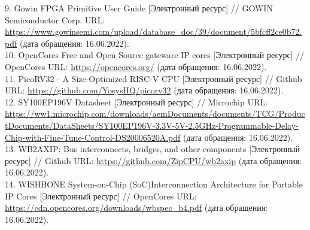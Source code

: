 9. Gowin FPGA Primitive User Guide [Электронный ресурс] // GOWIN Semiconductor Corp. URL: \url{https://www.gowinsemi.com/upload/database\_doc/39/document/5bfcff2ce0b72.pdf} (дата обращения: 16.06.2022).\\
10. OpenCores Free and Open Source gateware IP cores [Электронный ресурс] // OpenCores URL: \url{https://opencores.org/} (дата обращения: 16.06.2022).\\
11. PicoRV32 - A Size-Optimized RISC-V CPU [Электронный ресурс] // Github URL: \url{https://github.com/YosysHQ/picorv32} (дата обращения: 16.06.2022).\\
12. SY100EP196V Datasheet [Электронный ресурс] // Microchip URL: \url{https://ww1.microchip.com/downloads/aemDocuments/documents/TCG/ProductDocuments/DataSheets/SY100EP196V-3.3V-5V-2.5GHz-Programmable-Delay-Chip-with-Fine-Tune-Control-DS20006520A.pdf} (дата обращения: 16.06.2022).\\
13. WB2AXIP: Bus interconnects, bridges, and other components [Электронный ресурс] // Github URL: \url{https://github.com/ZipCPU/wb2axip} (дата обращения: 16.06.2022).\\
14. WISHBONE System-on-Chip (SoC)Interconnection Architecture for Portable IP Cores [Электронный ресурс] // OpenCores URL: \url{https://cdn.opencores.org/downloads/wbspec\_b4.pdf} (дата обращения: 16.06.2022). \\

